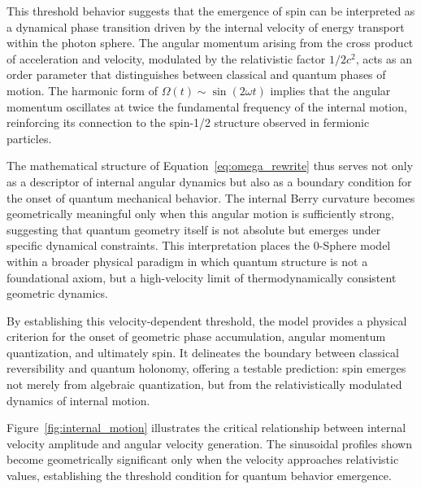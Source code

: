 \documentclass[%
 reprint,
 amsmath,amssymb,
 aps,
]{revtex4-1}
\numberwithin{equation}{section}%
\begin{document}
This threshold behavior suggests that the emergence of spin can be interpreted as a dynamical phase transition driven by the internal velocity of energy transport within the photon sphere. The angular momentum arising from the cross product of acceleration and velocity, modulated by the relativistic factor \( 1/2c^2 \), acts as an order parameter that distinguishes between classical and quantum phases of motion. The harmonic form of \( \Omega(t) \sim \sin(2\omega t) \) implies that the angular momentum oscillates at twice the fundamental frequency of the internal motion, reinforcing its connection to the spin-1/2 structure observed in fermionic particles.

The mathematical structure of Equation~\eqref{eq:omega_rewrite} thus serves not only as a descriptor of internal angular dynamics but also as a boundary condition for the onset of quantum mechanical behavior. The internal Berry curvature becomes geometrically meaningful only when this angular motion is sufficiently strong, suggesting that quantum geometry itself is not absolute but emerges under specific dynamical constraints. This interpretation places the 0-Sphere model within a broader physical paradigm in which quantum structure is not a foundational axiom, but a high-velocity limit of thermodynamically consistent geometric dynamics.

By establishing this velocity-dependent threshold, the model provides a physical criterion for the onset of geometric phase accumulation, angular momentum quantization, and ultimately spin. It delineates the boundary between classical reversibility and quantum holonomy, offering a testable prediction: spin emerges not merely from algebraic quantization, but from the relativistically modulated dynamics of internal motion.

Figure~\ref{fig:internal_motion} illustrates the critical relationship between internal velocity amplitude and angular velocity generation. The sinusoidal profiles shown become geometrically significant only when the velocity approaches relativistic values, establishing the threshold condition for quantum behavior emergence.
\end{document}
